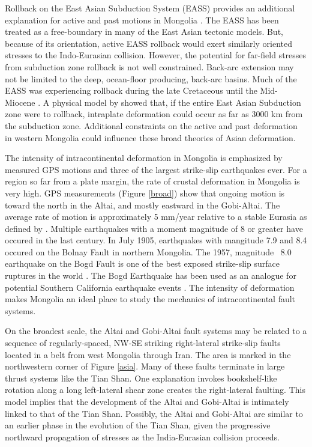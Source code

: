 	Rollback on the East Asian Subduction System (EASS) provides an additional explanation for active and past motions in Mongolia \citep{Schellart2005}. The EASS has been treated as a free-boundary in many of the East Asian tectonic models\citep{Tapponnier1982}\citep{Peltzer1996}\citep{Houseman1993}. But, because of its orientation, active EASS rollback would exert similarly oriented stresses to the Indo-Eurasian collision. However, the potential for far-field stresses from subduction zone rollback is not well constrained. Back-arc extension may not be limited to the deep, ocean-floor producing, back-arc basins. Much of the EASS was experiencing rollback during the late Cretaceous until the Mid-Miocene \citep{Northrup1995}\citep{Schellart2005a}. A physical model by \citet{Schellart2005} showed that, if the entire East Asian Subduction zone were to rollback, intraplate deformation could occur as far as 3000 km from the subduction zone. Additional constraints on the active and past deformation in western Mongolia could influence these broad theories of Asian deformation.

	 The intensity of intracontinental deformation in Mongolia is emphasized by measured GPS motions and three of the largest strike-slip earthquakes ever. For a region so far from a plate margin, the rate of crustal deformation in Mongolia is very high. GPS measurements (Figure \ref{broad}) show that ongoing motion is toward the north in the Altai, and mostly eastward in the Gobi-Altai\citep{Calais2003}. The average rate of motion is approximately 5 mm/year relative to a stable Eurasia as defined by \citet{Calais2003}. Multiple earthquakes with a moment magnitude of 8 or greater have occured in the last century. In July 1905, earthquakes with mangitude 7.9 and 8.4 occured on the Bolnay Fault in northern Mongolia. The 1957, magnitude ~8.0 earthquake on the Bogd Fault is one of the best exposed strike-slip surface ruptures in the world\citep{Kurushin1998} \citep{Okal1976a} \citep{Pollitz2003}. The Bogd Earthquake has been used as an analogue for potential Southern California earthquake events \citep{Bayarsayhan1996}.  The intensity of deformation makes Mongolia an ideal place to study the mechanics of intracontinental fault systems.
	
	On the broadest scale, the Altai and Gobi-Altai fault systems may be related to a sequence of regularly-spaced, NW-SE striking right-lateral strike-slip faults \citep{Yin2010} located in a belt from west Mongolia through Iran. The area is marked in the northwestern corner of Figure \ref{asia}. Many of these faults terminate in large thrust systems like the Tian Shan. One explanation invokes bookshelf-like rotation along a long left-lateral shear zone creates the right-lateral faulting. \citep{Davy1988}\citep{Bayasgalan2005a}  This model implies that the development of the Altai and Gobi-Altai is intimately linked to that of the Tian Shan. Possibly, the Altai and Gobi-Altai are similar to an earlier phase in the evolution of the Tian Shan, given the progressive northward propagation of stresses as the India-Eurasian collision proceeds.


